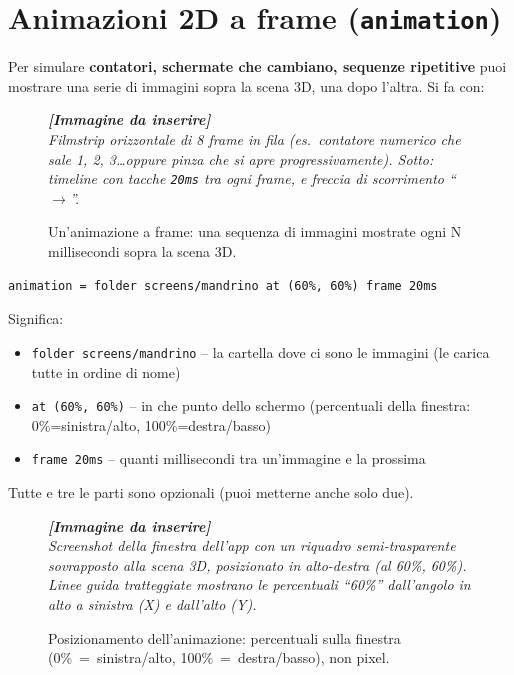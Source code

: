 ﻿\documentclass[a4paper,12pt,oneside]{book}
\newcommand{\val}[1]{\texttt{\color{cvtgreen}#1}}
\newcommand{\imgph}[2]{%
  \begin{tcolorbox}[colback=cvtlightblue!30,colframe=cvtblue!40,%
    width=#1,halign=center,valign=center,height=5cm,boxrule=0.5pt,arc=3pt]%
    \textcolor{cvtgray}{\itshape\footnotesize\textbf{[Immagine da inserire]}\\[3pt]#2}%
  \end{tcolorbox}}
\begin{document}
\chapter{Animazioni 2D a frame (\texttt{animation})}
\label{ch:animation}

Per simulare \textbf{contatori, schermate che cambiano, sequenze ripetitive}
puoi mostrare una serie di immagini sopra la scena 3D, una dopo l'altra. Si fa
con:

\begin{figure}[H]
  \centering
  \imgph{13cm}{Filmstrip orizzontale di 8 frame in fila (es.\ contatore numerico che sale 1, 2, 3\ldots oppure pinza che si apre progressivamente). Sotto: timeline con tacche \texttt{20ms} tra ogni frame, e freccia di scorrimento ``$\rightarrow$''.}
  \caption{Un'animazione a frame: una sequenza di immagini mostrate ogni N millisecondi sopra la scena 3D.}
  \label{fig:filmstrip}
\end{figure}

\begin{lstlisting}
animation = folder screens/mandrino at (60%, 60%) frame 20ms
\end{lstlisting}

Significa:
\begin{itemize}
  \item \val{folder screens/mandrino} -- la cartella dove ci sono le immagini
        (le carica tutte in ordine di nome)
  \item \val{at (60\%, 60\%)} -- in che punto dello schermo (percentuali della
        finestra: 0\%=sinistra/alto, 100\%=destra/basso)
  \item \val{frame 20ms} -- quanti millisecondi tra un'immagine e la prossima
\end{itemize}

Tutte e tre le parti sono opzionali (puoi metterne anche solo due).

\begin{figure}[H]
  \centering
  \imgph{12cm}{Screenshot della finestra dell'app con un riquadro semi-trasparente sovrapposto alla scena 3D, posizionato in alto-destra (al 60\%, 60\%). Linee guida tratteggiate mostrano le percentuali ``60\%'' dall'angolo in alto a sinistra (X) e dall'alto (Y).}
  \caption{Posizionamento dell'animazione: percentuali sulla finestra (0\%~=~sinistra/alto, 100\%~=~destra/basso), non pixel.}
  \label{fig:animazione-posizione}
\end{figure}
\end{document}
